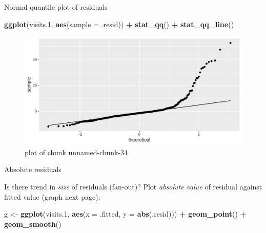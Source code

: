 \documentclass[ignorenonframetext,]{beamer}
\newenvironment{Shaded}{\begin{snugshade}}{\end{snugshade}}
\newcommand{\DataTypeTok}[1]{\textcolor[rgb]{0.13,0.29,0.53}{#1}}
\newcommand{\FloatTok}[1]{\textcolor[rgb]{0.00,0.00,0.81}{#1}}
\newcommand{\KeywordTok}[1]{\textcolor[rgb]{0.13,0.29,0.53}{\textbf{#1}}}
\newcommand{\NormalTok}[1]{#1}
\newcommand{\OperatorTok}[1]{\textcolor[rgb]{0.81,0.36,0.00}{\textbf{#1}}}
\newcommand{\StringTok}[1]{\textcolor[rgb]{0.31,0.60,0.02}{#1}}
\begin{document}
\begin{frame}[fragile]{Normal quantile plot of residuals}
\protect\hypertarget{normal-quantile-plot-of-residuals}{}

\begin{Shaded}
\begin{Highlighting}[]
\KeywordTok{ggplot}\NormalTok{(visits}\FloatTok{.1}\NormalTok{, }\KeywordTok{aes}\NormalTok{(}\DataTypeTok{sample =}\NormalTok{ .resid)) }\OperatorTok{+}\StringTok{ }\KeywordTok{stat_qq}\NormalTok{() }\OperatorTok{+}\StringTok{ }\KeywordTok{stat_qq_line}\NormalTok{()}
\end{Highlighting}
\end{Shaded}

\begin{figure}
\centering
\includegraphics{figure/unnamed-chunk-34-1.pdf}
\caption{plot of chunk unnamed-chunk-34}
\end{figure}

\end{frame}

\begin{frame}[fragile]{Absolute residuals}
\protect\hypertarget{absolute-residuals}{}

Is there trend in \emph{size} of residuals (fan-out)? Plot
\emph{absolute value} of residual against fitted value (graph next
page):

\begin{Shaded}
\begin{Highlighting}[]
\NormalTok{g <-}\StringTok{ }\KeywordTok{ggplot}\NormalTok{(visits}\FloatTok{.1}\NormalTok{, }\KeywordTok{aes}\NormalTok{(}\DataTypeTok{x =}\NormalTok{ .fitted, }\DataTypeTok{y =} \KeywordTok{abs}\NormalTok{(.resid))) }\OperatorTok{+}
\StringTok{  }\KeywordTok{geom_point}\NormalTok{() }\OperatorTok{+}\StringTok{ }\KeywordTok{geom_smooth}\NormalTok{()}
\end{Highlighting}
\end{Shaded}

\end{frame}
\end{document}

